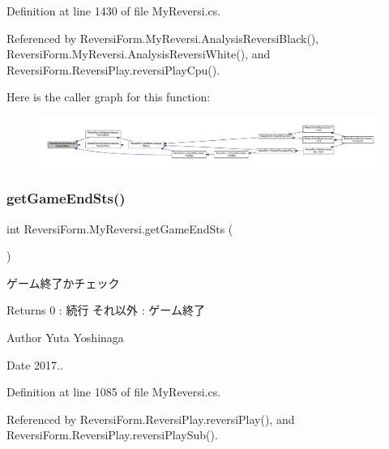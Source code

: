 Definition at line 1430 of file My\+Reversi.\+cs.



Referenced by Reversi\+Form.\+My\+Reversi.\+Analysis\+Reversi\+Black(), Reversi\+Form.\+My\+Reversi.\+Analysis\+Reversi\+White(), and Reversi\+Form.\+Reversi\+Play.\+reversi\+Play\+Cpu().

Here is the caller graph for this function\+:\nopagebreak
\begin{figure}[H]
\begin{center}
\leavevmode
\includegraphics[width=350pt]{class_reversi_form_1_1_my_reversi_a64216270f06c7c309d39bfcb681dd1b3_icgraph}
\end{center}
\end{figure}
\mbox{\label{class_reversi_form_1_1_my_reversi_aa39c8c111afeb4ea3bf2befbd9f1434b}} 
\subsubsection{\texorpdfstring{get\+Game\+End\+Sts()}{getGameEndSts()}}
{\footnotesize\ttfamily int Reversi\+Form.\+My\+Reversi.\+get\+Game\+End\+Sts (\begin{DoxyParamCaption}{ }\end{DoxyParamCaption})}



ゲーム終了かチェック 

\begin{DoxyReturn}{Returns}
0 \+: 続行 それ以外 \+: ゲーム終了 
\end{DoxyReturn}
\begin{DoxyAuthor}{Author}
Yuta Yoshinaga 
\end{DoxyAuthor}
\begin{DoxyDate}{Date}
2017.. 
\end{DoxyDate}


Definition at line 1085 of file My\+Reversi.\+cs.



Referenced by Reversi\+Form.\+Reversi\+Play.\+reversi\+Play(), and Reversi\+Form.\+Reversi\+Play.\+reversi\+Play\+Sub().

